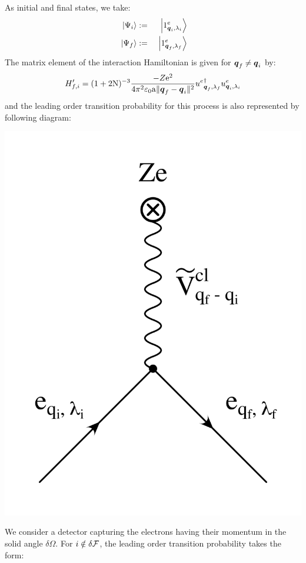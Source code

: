 \documentclass[10pt,a4paper,twoside,openany]{book}
\begin{document}
As initial and final states, we take:
\begin{eqnarray*}
\ \left|{\Psi_i}\right\rangle & := & \ \left|{{1}^{e}_{{\boldsymbol{q}_i}, {\lambda_i}}}\right\rangle \\
\ \left|{\Psi_f}\right\rangle & := & \ \left|{{1}^{e}_{{\boldsymbol{q}_f}, {\lambda_f}}}\right\rangle
\end{eqnarray*}
The matrix element of the interaction Hamiltonian is given for $\boldsymbol{q}_f \neq \boldsymbol{q}_i$ by:
\begin{equation*}
H'_{f,i} = (1 + 2 \mathrm N )^{-3} \frac {-Z \mathrm e^2}{4 \pi^2 \mathrm \varepsilon_0 \mathrm a \|{\boldsymbol{q}_f - \boldsymbol{q}_i}\|^2} {u^{e}}^{\dagger}_{{\boldsymbol{q}_f}, {\lambda_f}} u^{e}_{{\boldsymbol{q}_i}, {\lambda_i}}
\end{equation*}
and the leading order transition probability for this process is also represented by following diagram:
\begin{center}
\includegraphics[scale=0.2]{images/diagrams/Coulomb_Scattering.pdf}
\end{center}
We consider a detector capturing the electrons having their momentum in the solid angle $\delta \Omega$. For $i \notin \delta \mathcal F$, the leading order transition probability takes the form:
\end{document}
